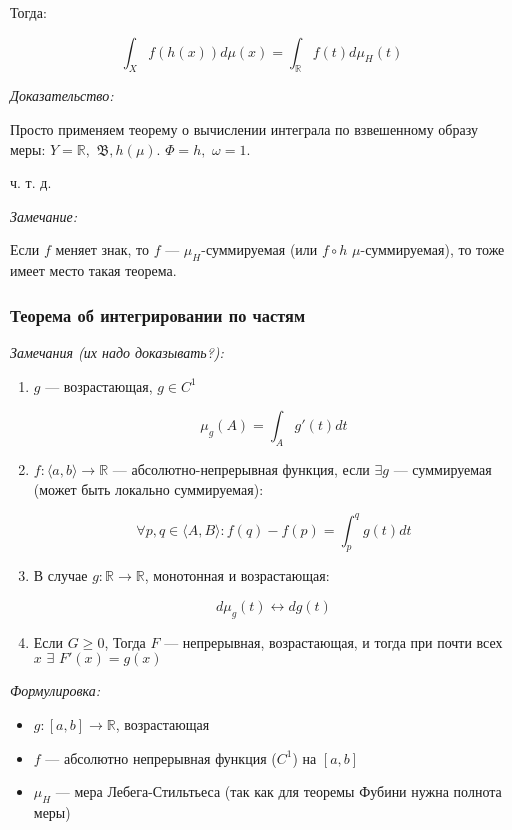 \documentclass{article}
\def\dbl{\,\,}
\begin{document}
Тогда:

\[\int_{X} f\left(h(x)\right)d\mu(x) = \int_{\mathbb{R}} f(t)d\mu_{H}(t)\]

\textit{Доказательство:}

Просто применяем теорему о вычислении интеграла по взвешенному образу меры: $Y = \mathbb{R}, \dbl \mathfrak{B}, h(\mu)$. $\Phi = h, \dbl \omega = 1$.

ч. т. д. 

\textit{Замечание: }

Если $f$ меняет знак, то $f$ --- $\mu_H$-суммируемая (или $f \circ h \dbl \mu$-суммируемая), то тоже имеет место такая теорема.

\subsubsection{Теорема об интегрировании по частям}

\textit{Замечания (их надо доказывать?):}

\begin{enumerate}
    \item $g$ --- возрастающая, $g \in C^1$
    
    \[\mu_g(A) = \int_{A} g'(t) dt\]

    \item $f: \langle a, b \rangle \rightarrow \mathbb{R}$ --- абсолютно-непрерывная функция, если $\exists g$ --- суммируемая (может быть локально суммируемая):
    
    \[\forall p, q \in \langle A, B \rangle: f(q) - f(p) = \int_p^q g(t) dt\]

    \item В случае $g: \mathbb{R} \rightarrow \mathbb{R}$, монотонная и возрастающая:
    
    \[d \mu_g(t) \leftrightarrow dg(t)\]

    \item Если $G \ge 0$, Тогда $F$ --- непрерывная, возрастающая, и тогда при почти всех $x \dbl \exists \dbl F'(x) = g(x)$
\end{enumerate}

\textit{Формулировка: }

\begin{itemize}
    \item $g: [a, b] \rightarrow \mathbb{R}$, возрастающая
    \item $f$ --- абсолютно непрерывная функция ($C^{1}$) на $[a, b]$
    \item $\mu_{H}$ --- мера Лебега-Стильтьеса (так как для теоремы Фубини нужна полнота меры)
\end{itemize}
\end{document}
